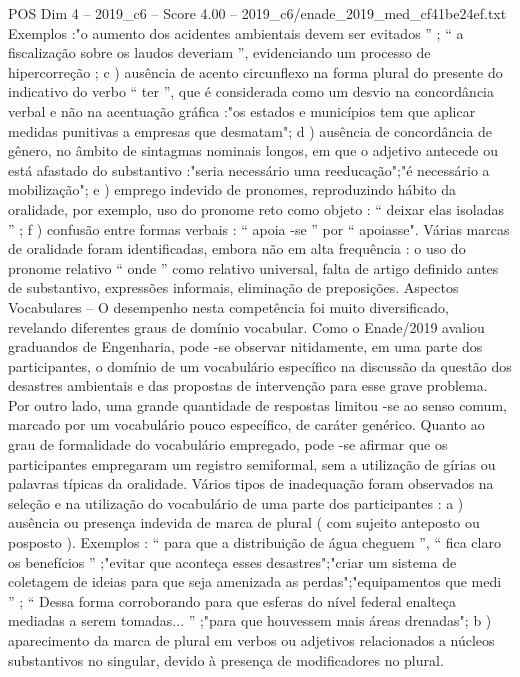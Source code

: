 \begin{textsample}{POS Dim 4 – 2019\_c6 – Score 4.00 – 2019\_c6/enade\_2019\_med\_cf41be24ef.txt}
Exemplos :"o aumento dos acidentes ambientais devem ser evitados ” ; “ a fiscalização sobre os laudos deveriam ”, evidenciando um processo de hipercorreção ; c ) ausência de acento circunflexo na forma plural do presente do indicativo do verbo “ ter ”, que é considerada como um desvio na concordância verbal e não na acentuação gráfica :"os estados e municípios tem que aplicar medidas punitivas a empresas que desmatam"; d ) ausência de concordância de gênero, no âmbito de sintagmas nominais longos, em que o adjetivo antecede ou está afastado do substantivo :"seria necessário uma reeducação";"é necessário a mobilização"; e ) emprego indevido de pronomes, reproduzindo hábito da oralidade, por exemplo, uso do pronome reto como objeto : “ deixar elas isoladas ” ; f ) confusão entre formas verbais : “ apoia -se ” por “ apoiasse".
Várias marcas de oralidade foram identificadas, embora não em alta frequência : o uso do pronome relativo “ onde ” como relativo universal, falta de artigo definido antes de substantivo, expressões informais, eliminação de preposições.
Aspectos Vocabulares – O desempenho nesta competência foi muito diversificado, revelando diferentes graus de domínio vocabular.
Como o Enade/2019 avaliou graduandos de Engenharia, pode -se observar nitidamente, em uma parte dos participantes, o domínio de um vocabulário específico na discussão da questão dos desastres ambientais e das propostas de intervenção para esse grave problema.
Por outro lado, uma grande quantidade de respostas limitou -se ao senso comum, marcado por um vocabulário pouco específico, de caráter genérico.
Quanto ao grau de formalidade do vocabulário empregado, pode -se afirmar que os participantes empregaram um registro semiformal, sem a utilização de gírias ou palavras típicas da oralidade.
Vários tipos de inadequação foram observados na seleção e na utilização do vocabulário de uma parte dos participantes : a ) ausência ou presença indevida de marca de plural ( com sujeito anteposto ou posposto ).
Exemplos : “ para que a distribuição de água cheguem ”, “ fica claro os benefícios ” ;"evitar que aconteça esses desastres";"criar um sistema de coletagem de ideias para que seja amenizada as perdas";"equipamentos que medi ” ; “ Dessa forma corroborando para que esferas do nível federal enalteça mediadas a serem tomadas... ” ;"para que houvessem mais áreas drenadas"; b ) aparecimento da marca de plural em verbos ou adjetivos relacionados a núcleos substantivos no singular, devido à presença de modificadores no plural.

\end{textsample}
